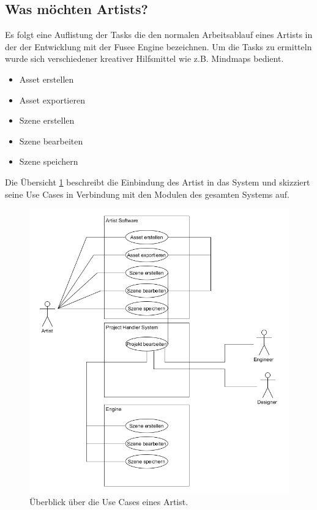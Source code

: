 \documentclass[pagesize, paper=a4, fontsize=12pt, titlepage=true, headings=small, headnosepline, abstractoff, liststotoc, nochapterprefix, plainheadsepline, twoside]{scrreprt}
\begin{document}
\subsection{Was möchten Artists?}
Es folgt eine Auflistung der Tasks die den normalen Arbeitsablauf eines Artists in der der Entwicklung mit der Fusee Engine bezeichnen. Um die Tasks zu ermitteln wurde sich verschiedener kreativer Hilfsmittel wie z.B. Mindmaps bedient.
\begin{itemize}
\item Asset erstellen
\item Asset exportieren
\item Szene erstellen
\item Szene bearbeiten
\item Szene speichern
\end{itemize}

Die Übersicht \ref{UseCaseArtist} beschreibt die Einbindung des Artist in das System und skizziert seine Use Cases in Verbindung mit den Modulen des gesamten Systems auf.
\begin{figure}[ht]
	\centering
	\includegraphics[width=\linewidth]{Bilder/UseCase_Artist.png}
	\caption{Überblick über die Use Cases eines Artist.}
	\label{UseCaseArtist}
\end{figure}
\end{document}
